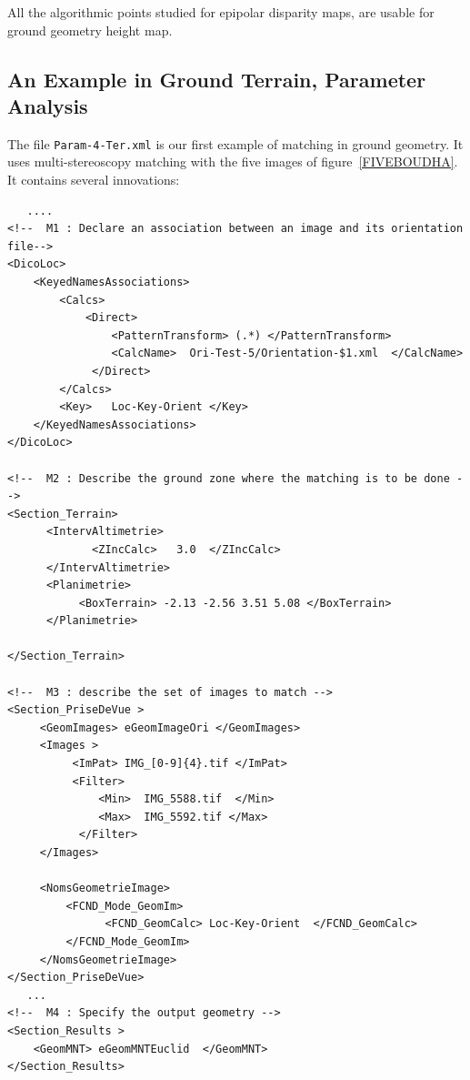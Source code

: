 All the algorithmic points studied for epipolar disparity maps, are usable for 
ground geometry height map.


\subsection{An Example in Ground Terrain, Parameter Analysis}


\label{FIRSTASSOC:LOC}
The file {\tt Param-4-Ter.xml} is our first example of matching in ground geometry.
It uses multi-stereoscopy matching with the five images of figure~\ref{FIVEBOUDHA}.
It contains several innovations:

{\scriptsize
\begin{verbatim}
   ....
<!--  M1 : Declare an association between an image and its orientation file-->
<DicoLoc>   
    <KeyedNamesAssociations>
        <Calcs>
            <Direct>
                <PatternTransform> (.*) </PatternTransform>
                <CalcName>  Ori-Test-5/Orientation-$1.xml  </CalcName>
             </Direct>
        </Calcs>
        <Key>   Loc-Key-Orient </Key>
    </KeyedNamesAssociations>
</DicoLoc>

<!--  M2 : Describe the ground zone where the matching is to be done -->
<Section_Terrain>    
      <IntervAltimetrie>
             <ZIncCalc>   3.0  </ZIncCalc>
      </IntervAltimetrie>
      <Planimetrie>
           <BoxTerrain> -2.13 -2.56 3.51 5.08 </BoxTerrain>
      </Planimetrie>

</Section_Terrain>

<!--  M3 : describe the set of images to match -->
<Section_PriseDeVue >   
     <GeomImages> eGeomImageOri </GeomImages>
     <Images >
          <ImPat> IMG_[0-9]{4}.tif </ImPat>
          <Filter>
              <Min>  IMG_5588.tif  </Min>
              <Max>  IMG_5592.tif </Max>
           </Filter>
     </Images>

     <NomsGeometrieImage>
         <FCND_Mode_GeomIm>
               <FCND_GeomCalc> Loc-Key-Orient  </FCND_GeomCalc>
         </FCND_Mode_GeomIm>
     </NomsGeometrieImage>
</Section_PriseDeVue>
   ...
<!--  M4 : Specify the output geometry -->
<Section_Results >
    <GeomMNT> eGeomMNTEuclid  </GeomMNT>
</Section_Results>

\end{verbatim}
}

